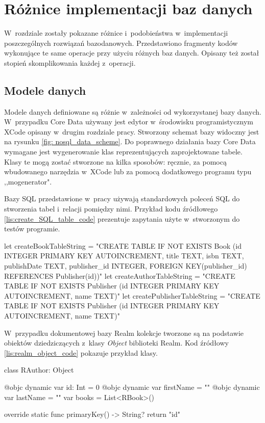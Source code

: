 \section{Różnice implementacji baz danych}

 W~rozdziale zostały pokazane różnice i~podobieństwa w~implementacji poszczególnych rozwiązań bazodanowych. Przedstawiono fragmenty kodów wykonujące te same operacje przy użyciu różnych baz danych. Opisany też został stopień skomplikowania każdej z~operacji. 

\subsection{Modele danych}
Modele danych definiowane są różnie w~zależności od wykorzystanej bazy danych. W~przypadku Core Data używany jest edytor w~środowisku programistycznym XCode opisany w~drugim rozdziale pracy. Stworzony schemat bazy widoczny jest na rysunku \ref{fig: nosql_data_scheme}. Do poprawnego działania bazy Core Data wymagane jest wygenerowanie klas reprezentujących zaprojektowane tabele. Klasy te mogą zostać stworzone na kilka sposobów: ręcznie, za pomocą wbudowanego narzędzia w~XCode lub za pomocą dodatkowego programu typu ,,mogenerator". 

Bazy SQL przedstawione w~pracy używają standardowych poleceń SQL do stworzenia tabel i~relacji pomiędzy nimi. Przykład kodu źródłowego \ref{lis:create_SQL_table_code} prezentuje zapytania użyte w~stworzonym do testów  programie. 

\begin{code}[
		language=swift,
		caption={Polecenia tworzenia tabel w~SQLite i~FMDB},
		label={lis:create_SQL_table_code},
		escapechar=|
	]
    let createBookTableString = "CREATE TABLE IF NOT EXISTS Book (id INTEGER PRIMARY KEY AUTOINCREMENT, title TEXT, isbn TEXT, publishDate TEXT, publisher_id INTEGER, FOREIGN KEY(publisher_id) REFERENCES Publisher(id))"
    let createAuthorTableString = "CREATE TABLE IF NOT EXISTS Publisher (id INTEGER PRIMARY KEY AUTOINCREMENT, name TEXT)"
    let createPublisherTableString = "CREATE TABLE IF NOT EXISTS Publisher (id INTEGER PRIMARY KEY AUTOINCREMENT, name TEXT)"
\end{code}

\bigskip
W~przypadku dokumentowej bazy Realm kolekcje tworzone są na podstawie obiektów dziedziczących z~klasy \textit{Object} biblioteki Realm. Kod źródłowy \ref{lis:realm_object_code} pokazuje przykład klasy.

\begin{code}[
		language=swift,
		caption={Przykład obiektu bazy Realm},
		label={lis:realm_object_code},
	]
class RAuthor: Object {
    
    @objc dynamic var id: Int = 0
    @objc dynamic var firstName = ""
    @objc dynamic var lastName = ""    
    var books = List<RBook>()
    
    override static func primaryKey() -> String? {
        return "id"
    }
}
\end{code}
\bigskip

